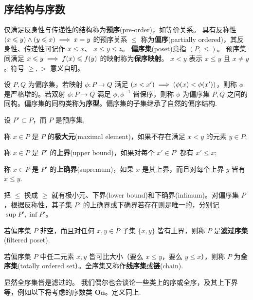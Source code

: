 \subsection{序结构与序数}\label{sec:order}

\begin{definition}
	仅满足反身性与传递性的结构称为\textbf{预序}(pre-order)，如等价关系。
	具有反称性 $(x \leqslant y) \land (y \leqslant x) \implies x=y$ 的预序关系 $\leqslant$ 称为\textbf{偏序}(partially ordered)，其反身性、传递性可记作 $x \leqslant x$、 $x \leqslant y \leqslant z$。
	\textbf{偏序集}(poset)意指 $(P,\leqslant)$。
	预序集间满足 $x \leqslant y \implies f(x) \leqslant f(y)$ 的映射称为\textbf{保序映射}。
	$x < y$ 表示 $x \leqslant y$ 且 $x \neq y$。符号 $\geqslant,>$ 意义自明。
\end{definition}

设 $P, Q$ 为偏序集，若映射 $\phi: P \to Q$ 满足 $(x < x') \implies (\phi(x) < \phi(x'))$，则称 $\phi$ 是严格增的。若双射 $\phi: P \to Q$ 满足 $\phi,\phi^{-1}$ 皆保序，则称 $\phi$ 为偏序集 $P,Q$ 之间的同构。偏序集的同构类称为\textbf{序型}。偏序集的子集继承了自然的偏序结构.

\begin{definition}
	设 $P' \subset P$，而 $P$ 是预序集,
	\begin{compactitem}
		\item 称 $x \in P$ 是 $P$ 的\textbf{极大元}(maximal element)，如果不存在满足 $x < y$ 的元素 $y \in P$;
		\item 称 $x \in P$ 是 $P'$ 的\textbf{上界}(upper bound)，如果对每个 $x' \in P'$ 都有 $x' \leqslant x$;
		\item 称 $x \in P$ 是 $P'$ 的\textbf{上确界}(supremum)，如果 $x$ 是其上界，而且对每个上界 $y$ 皆有 $x \leqslant y$.
	\end{compactitem}
	把 $\leqslant$ 换成 $\geqslant$ 就有极小元、下界(lower bound)和下确界(infimum)。对偏序集 $P$，根据反称性，其子集 $P'$ 的上确界或下确界若存在则是唯一的，分别记 $\sup P', \inf P'$。
\end{definition}

\begin{definition}
	若偏序集 $P$ 非空，而且对任何 $x,y \in P$ 子集 $\{x,y\}$ 皆有上界，则称 $P$ 是\textbf{滤过序集}(filtered poset).
\end{definition}

\begin{definition}
	若偏序集 $P$ 中任二元素 $x,y$ 皆可比大小（要么 $x \leqslant y$，要么 $y \leqslant x$），则称 $P$ 为\textbf{全序集}(totally ordered set）。全序集又称作\textbf{线序集}或\textbf{链}(chain).
\end{definition}
显然全序集皆是滤过的。
我们偶尔也会谈论一些类上的序或全序，及其上下界等，例如以下将考虑的序数类 $\mathbf{On}$。定义同上.

